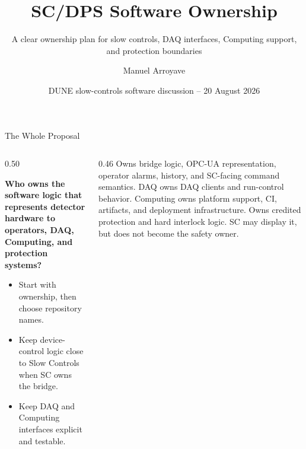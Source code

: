 \documentclass[aspectratio=169,10pt]{beamer}
\title[SC/DPS Software Ownership]{SC/DPS Software Ownership}
\subtitle{A clear ownership plan for slow controls, DAQ interfaces, Computing support, and protection boundaries}
\author{Manuel Arroyave}
\date{DUNE slow-controls software discussion -- 20 August 2026}
\begin{document}
\begin{frame}[plain]
  \titlepage
\end{frame}

\begin{frame}{The Whole Proposal}
\begin{columns}[T,onlytextwidth]
  \begin{column}{0.50\textwidth}
    {\color{white}\bfseries\fontsize{16}{19}\selectfont
    Who owns the software logic that represents detector hardware to operators, DAQ, Computing, and protection systems?\par}
    \medskip
    \begin{itemize}
      \DuneTightList
      \item Start with ownership, then choose repository names.
      \item Keep device-control logic close to Slow Controls when SC owns the bridge.
      \item Keep DAQ and Computing interfaces explicit and testable.
    \end{itemize}
  \end{column}
  \begin{column}{0.46\textwidth}
      {Owns bridge logic, OPC-UA representation, operator alarms, history, and SC-facing command semantics.}
      {}
    \smallskip
      {DAQ owns DAQ clients and run-control behavior. Computing owns platform support, CI, artifacts, and deployment infrastructure.}
      {}
    \smallskip
      {Owns credited protection and hard interlock logic. SC may display it, but does not become the safety owner.}
      {}
  \end{column}
\end{columns}
\end{frame}
\end{document}
